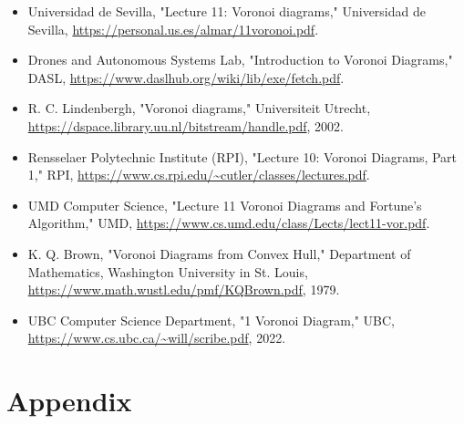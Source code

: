 \documentclass[12pt,a4paper]{report}
\begin{document}
\begin{itemize}
  \item Universidad de Sevilla, "Lecture 11: Voronoi diagrams," Universidad de Sevilla, \url{https://personal.us.es/almar/11voronoi.pdf}.
  
  \item Drones and Autonomous Systems Lab, "Introduction to Voronoi Diagrams," DASL, \url{https://www.daslhub.org/wiki/lib/exe/fetch.pdf}.
  
  \item R. C. Lindenbergh, "Voronoi diagrams," Universiteit Utrecht, \url{https://dspace.library.uu.nl/bitstream/handle.pdf}, 2002.
  
  \item Rensselaer Polytechnic Institute (RPI), "Lecture 10: Voronoi Diagrams, Part 1," RPI, \url{https://www.cs.rpi.edu/~cutler/classes/lectures.pdf}.
  
  \item UMD Computer Science, "Lecture 11 Voronoi Diagrams and Fortune's Algorithm," UMD, \url{https://www.cs.umd.edu/class/Lects/lect11-vor.pdf}.
  
  \item K. Q. Brown, "Voronoi Diagrams from Convex Hull," Department of Mathematics, Washington University in St. Louis, \url{https://www.math.wustl.edu/pmf/KQBrown.pdf}, 1979.
  
  \item UBC Computer Science Department, "1 Voronoi Diagram," UBC, \url{https://www.cs.ubc.ca/~will/scribe.pdf}, 2022.
\end{itemize}

\chapter{Appendix}

\begin{center}

\end{center}

\begin{center}

\end{center}

\begin{center}

\end{center}
\end{document}
